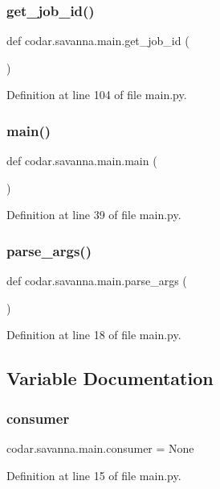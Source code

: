 \subsubsection{\texorpdfstring{get\+\_\+job\+\_\+id()}{get\_job\_id()}}
{\footnotesize\ttfamily def codar.\+savanna.\+main.\+get\+\_\+job\+\_\+id (\begin{DoxyParamCaption}{ }\end{DoxyParamCaption})}



Definition at line 104 of file main.\+py.

\mbox{\label{namespacecodar_1_1savanna_1_1main_ab5690a0c0dfa679e7b43175a365b5a81}} 
\subsubsection{\texorpdfstring{main()}{main()}}
{\footnotesize\ttfamily def codar.\+savanna.\+main.\+main (\begin{DoxyParamCaption}{ }\end{DoxyParamCaption})}



Definition at line 39 of file main.\+py.

\mbox{\label{namespacecodar_1_1savanna_1_1main_a09ab91d19cb193d6d01e65d3f415ec22}} 
\subsubsection{\texorpdfstring{parse\+\_\+args()}{parse\_args()}}
{\footnotesize\ttfamily def codar.\+savanna.\+main.\+parse\+\_\+args (\begin{DoxyParamCaption}{ }\end{DoxyParamCaption})}



Definition at line 18 of file main.\+py.



\subsection{Variable Documentation}
\mbox{\label{namespacecodar_1_1savanna_1_1main_a12ce430b046def16041cbc8435c43dbc}} 
\subsubsection{\texorpdfstring{consumer}{consumer}}
{\footnotesize\ttfamily codar.\+savanna.\+main.\+consumer = None}



Definition at line 15 of file main.\+py.

